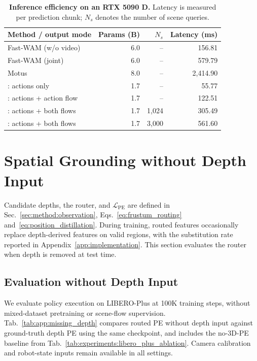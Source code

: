\begin{table}[!htbp]
    \centering
    \small
    \setlength{\tabcolsep}{6pt}
    \renewcommand{\arraystretch}{1.08}
    \caption{\textbf{Inference efficiency on an RTX 5090 D.}
    Latency is measured per prediction chunk; $N_s$ denotes the number
    of scene queries.}
    \label{tab:app:inference_efficiency}
    \begin{tabular}{@{}lrrr@{}}
        \toprule
        Method / output mode & Params (B) & $N_s$ & Latency (ms) \\
        \midrule
        Fast-WAM (w/o video) & 6.0 & -- & 156.81 \\
        Fast-WAM (joint) & 6.0 & -- & 579.79 \\
        Motus & 8.0 & -- & 2,414.90 \\
        \midrule
        \method{}: actions only & 1.7 & -- & 55.77 \\
        \method{}: actions + action flow & 1.7 & -- & 122.51 \\
        \method{}: actions + both flows & 1.7 & 1,024 & 305.49 \\
        \method{}: actions + both flows & 1.7 & 3,000 & 561.60 \\
        \bottomrule
    \end{tabular}
\end{table}

\section{Spatial Grounding without Depth Input}
\label{app:missing_depth}

Candidate depths, the router, and $\mathcal L_{\mathrm{PE}}$ are defined
in Sec.~\ref{sec:method:observation},
Eqs.~\eqref{eq:frustum_routing} and~\eqref{eq:position_distillation}.
During training, routed features occasionally replace depth-derived
features on valid regions, with the substitution rate reported in
Appendix~\ref{app:implementation}.
This section evaluates the router when depth is removed at test time.

\subsection{Evaluation without Depth Input}
\label{app:missing_depth:evaluation}

We evaluate policy execution on LIBERO-Plus at 100K training steps,
without mixed-dataset pretraining or scene-flow supervision.
Tab.~\ref{tab:app:missing_depth} compares routed PE without depth input
against ground-truth depth PE using the same checkpoint, and includes
the no-3D-PE baseline from Tab.~\ref{tab:experiments:libero_plus_ablation}.
Camera calibration and robot-state inputs remain available in all settings.

